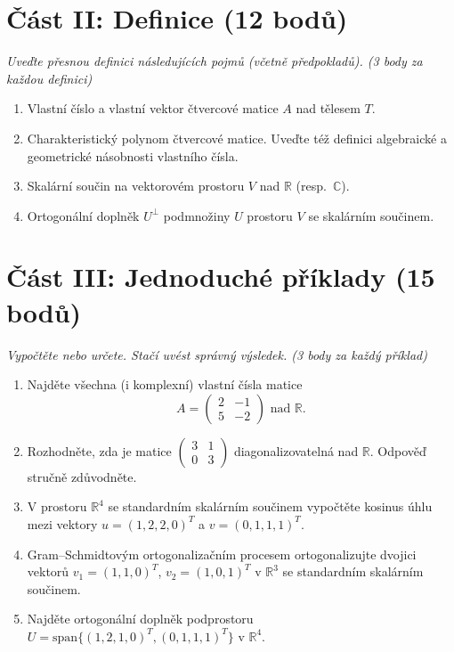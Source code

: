 \documentclass[a4paper,11pt]{article}
\begin{document}
\vspace{0.5cm}

\section*{Část II: Definice (12 bodů)}
\textit{Uveďte přesnou definici následujících pojmů (včetně předpokladů). (3 body za každou definici)}

\begin{enumerate}
    \item Vlastní číslo a vlastní vektor čtvercové matice $A$ nad tělesem $T$.
    \item Charakteristický polynom čtvercové matice. Uveďte též definici algebraické a geometrické násobnosti vlastního čísla.
    \item Skalární součin na vektorovém prostoru $V$ nad $\mathbb{R}$ (resp.\ $\mathbb{C}$).
    \item Ortogonální doplněk $U^\perp$ podmnožiny $U$ prostoru $V$ se skalárním součinem.
\end{enumerate}

\vspace{0.5cm}

\section*{Část III: Jednoduché příklady (15 bodů)}
\textit{Vypočtěte nebo určete. Stačí uvést správný výsledek. (3 body za každý příklad)}

\begin{enumerate}
    \item Najděte všechna (i komplexní) vlastní čísla matice 
    $$A = \begin{pmatrix} 2 & -1 \\ 5 & -2 \end{pmatrix} \text{ nad } \mathbb{R}.$$
    
    \item Rozhodněte, zda je matice $\begin{pmatrix} 3 & 1 \\ 0 & 3 \end{pmatrix}$ diagonalizovatelná nad $\mathbb{R}$. Odpověď stručně zdůvodněte.
    
    \item V prostoru $\mathbb{R}^4$ se standardním skalárním součinem vypočtěte kosinus úhlu mezi vektory $u = (1, 2, 2, 0)^T$ a $v = (0, 1, 1, 1)^T$.
    
    \item Gram--Schmidtovým ortogonalizačním procesem ortogonalizujte dvojici vektorů $v_1 = (1, 1, 0)^T$, $v_2 = (1, 0, 1)^T$ v $\mathbb{R}^3$ se standardním skalárním součinem.
    
    \item Najděte ortogonální doplněk podprostoru $U = \mathrm{span}\{(1,2,1,0)^T, (0,1,1,1)^T\}$ v $\mathbb{R}^4$.
\end{enumerate}
\end{document}
